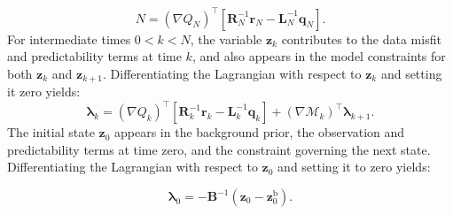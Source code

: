 \documentclass[final,1p,times]{elsarticle}
\begin{document}
\begin{equation}
N = 
    (\nabla Q_N)^\top \left[
    \mathbf{R}_N^{-1} \mathbf{r}_N
    - \mathbf{L}_N^{-1} \mathbf{q}_N
    \right].
\end{equation}
For intermediate times $ 0 < k < N $, the variable $ \mathbf{z}_k $ contributes to the data misfit and predictability terms at time $ k $, and also appears in the model constraints for both $ \mathbf{z}_k $ and $ \mathbf{z}_{k+1} $. 
Differentiating the Lagrangian with respect to $ \mathbf{z}_k $ and setting it zero yields:
\begin{equation}
    \boldsymbol{\lambda}_k = (\nabla Q_k)^\top 
    \left[
    \mathbf{R}_k^{-1} \mathbf{r}_{k}
    - \mathbf{L}_k^{-1} \mathbf{q}_{k}
    \right]
    + (\nabla \mathcal{M}_k)^\top \boldsymbol{\lambda}_{k+1}.
\end{equation}
The initial state $ \mathbf{z}_0 $ appears in the background prior, the observation and predictability terms at time zero, and the constraint governing the next state. 
Differentiating the Lagrangian with respect to $\mathbf{z}_0$ and setting it to zero yields:

\begin{equation}
    \boldsymbol{\lambda}_0 = 
-\mathbf{B}^{-1} (\mathbf{z}_0 - \mathbf{z}_0^{\mathrm{b}}).
\end{equation}
\end{document}
